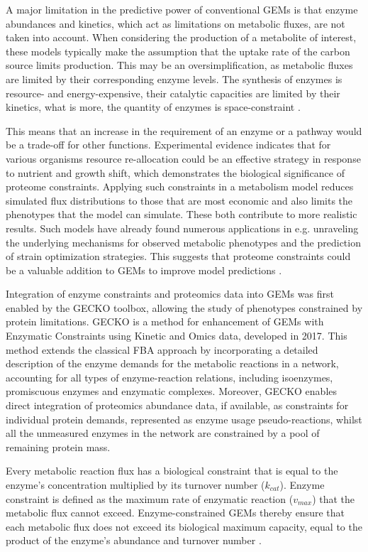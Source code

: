 A major limitation in the predictive power of conventional GEMs is that enzyme abundances and kinetics, which act as limitations on 
metabolic fluxes, are not taken into account. When considering the production of a metabolite of interest, 
these models typically make the assumption that the uptake rate of the carbon source limits production. 
This may be an oversimplification, as metabolic fluxes are limited by their corresponding enzyme levels. \cite{Sanchez2017}
The synthesis of enzymes is resource- and energy-expensive, their catalytic 
capacities are limited by their kinetics, what is more, the quantity of enzymes is space-constraint \cite{Kerkhoven2022}.

This means that an increase in the requirement of an enzyme or a pathway would be a trade-off for other
functions. Experimental evidence indicates that for various organisms resource re-allocation could be an effective strategy 
in response to nutrient and growth shift, which demonstrates the biological significance 
of proteome constraints. \cite{Chen2023} 
Applying such constraints in a metabolism model reduces simulated flux distributions to those that are most 
economic and also limits the phenotypes that the model can simulate. These both contribute to more realistic results. 
Such models have already found numerous applications in e.g. unraveling the underlying mechanisms for observed metabolic 
phenotypes and the prediction of strain optimization strategies. \cite{Kerkhoven2022}
This suggests that proteome constraints could be a valuable addition to GEMs to
improve model predictions \cite{Chen2023}. 

Integration of enzyme constraints and proteomics data into GEMs was first enabled by the GECKO toolbox, allowing the study of phenotypes constrained by 
protein limitations. GECKO is a method for enhancement of GEMs with Enzymatic Constraints using 
Kinetic and Omics data, developed in 2017. This method extends the classical FBA 
approach by incorporating a detailed description of the enzyme demands for the metabolic reactions in a network, accounting for all types of enzyme-reaction 
relations, including isoenzymes, promiscuous enzymes and enzymatic complexes. Moreover, GECKO enables direct integration of proteomics abundance data, 
if available, as constraints for individual protein demands, represented as enzyme usage pseudo-reactions, whilst all the unmeasured enzymes in the network 
are constrained by a pool of remaining protein mass. \cite{Domenzain2022}

Every metabolic reaction flux has a
biological constraint that is equal to the enzyme's concentration multiplied by its turnover number ($k_{cat}$). Enzyme constraint is
defined as the maximum rate of enzymatic reaction ($v_{max}$) that the metabolic flux cannot exceed. Enzyme-constrained GEMs thereby 
ensure that each metabolic flux does not exceed its biological maximum capacity, 
equal to the product of the enzyme's abundance and turnover number \cite{Sanchez2017}.

